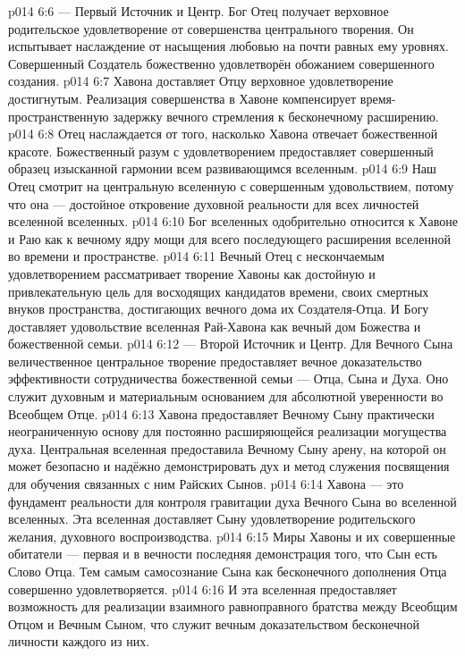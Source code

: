 \vs p014 6:6  --- Первый Источник и Центр. Бог Отец получает верховное родительское удовлетворение от совершенства центрального творения. Он испытывает наслаждение от насыщения любовью на почти равных ему уровнях. Совершенный Создатель божественно удовлетворён обожанием совершенного создания.
\vs p014 6:7 Хавона доставляет Отцу верховное удовлетворение достигнутым. Реализация совершенства в Хавоне компенсирует время\hyp{}пространственную задержку вечного стремления к бесконечному расширению.
\vs p014 6:8 Отец наслаждается от того, насколько Хавона отвечает божественной красоте. Божественный разум с удовлетворением предоставляет совершенный образец изысканной гармонии всем развивающимся вселенным.
\vs p014 6:9 Наш Отец смотрит на центральную вселенную с совершенным удовольствием, потому что она --- достойное откровение духовной реальности для всех личностей вселенной вселенных.
\vs p014 6:10 Бог вселенных одобрительно относится к Хавоне и Раю как к вечному ядру мощи для всего последующего расширения вселенной во времени и пространстве.
\vs p014 6:11 Вечный Отец с нескончаемым удовлетворением рассматривает творение Хавоны как достойную и привлекательную цель для восходящих кандидатов времени, своих смертных внуков пространства, достигающих вечного дома их Создателя\hyp{}Отца. И Богу доставляет удовольствие вселенная Рай\hyp{}Хавона как вечный дом Божества и божественной семьи.
\vs p014 6:12  --- Второй Источник и Центр. Для Вечного Сына величественное центральное творение предоставляет вечное доказательство эффективности сотрудничества божественной семьи --- Отца, Сына и Духа. Оно служит духовным и материальным основанием для абсолютной уверенности во Всеобщем Отце.
\vs p014 6:13 Хавона предоставляет Вечному Сыну практически неограниченную основу для постоянно расширяющейся реализации могущества духа. Центральная вселенная предоставила Вечному Сыну арену, на которой он может безопасно и надёжно демонстрировать дух и метод служения посвящения для обучения связанных с ним Райских Сынов.
\vs p014 6:14 Хавона --- это фундамент реальности для контроля гравитации духа Вечного Сына во вселенной вселенных. Эта вселенная доставляет Сыну удовлетворение родительского желания, духовного воспроизводства.
\vs p014 6:15 Миры Хавоны и их совершенные обитатели --- первая и в вечности последняя демонстрация того, что Сын есть Слово Отца. Тем самым самосознание Сына как бесконечного дополнения Отца совершенно удовлетворяется.
\vs p014 6:16 И эта вселенная предоставляет возможность для реализации взаимного равноправного братства между Всеобщим Отцом и Вечным Сыном, что служит вечным доказательством бесконечной личности каждого из них.
